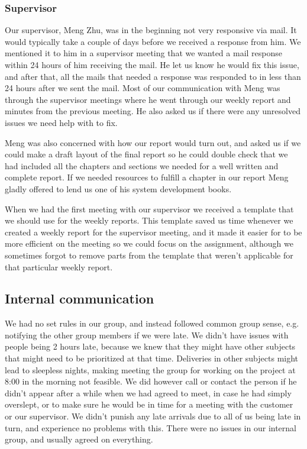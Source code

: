 \subsubsection{Supervisor}
Our supervisor, Meng Zhu, was in the beginning not very responsive via mail. It would typically take a couple of days before we received a response from him. We mentioned it to him in a supervisor meeting that we wanted a mail response within 24 hours of him receiving the mail. He let us know he would fix this issue, and after that, all the mails that needed a response was responded to in less than 24 hours after we sent the mail. Most of our communication with Meng was through the supervisor meetings where he went through our weekly report and minutes from the previous meeting. He also asked us if there were any unresolved issues we need help with to fix. 

Meng was also concerned with how our report would turn out, and asked us if we could make a draft layout of the final report so he could double check that we had included all the chapters and sections we needed for a well written and complete report. If we needed resources to fulfill a chapter in our report Meng gladly offered to lend us one of his system development books. 

When we had the first meeting with our supervisor we received a template that we should use for the weekly reports. This template saved us time whenever we created a weekly report for the supervisor meeting, and it made it easier for to be more efficient on the meeting so we could focus on the assignment, although we sometimes forgot to remove parts from the template that weren't applicable for that particular weekly report.

\subsection{Internal communication}
We had no set rules in our group, and instead followed common group sense, e.g. notifying the other group members if we were late. We didn't have issues with people being 2 hours late, because we knew that they might have other subjects that might need to be prioritized at that time. Deliveries in other subjects might lead to sleepless nights, making meeting the group for working on the project at 8:00 in the morning not feasible. We did however call or contact the person if he didn't appear after a while when we had agreed to meet, in case he had simply overslept, or to make sure he would be in time for a meeting with the customer or our supervisor. We didn't punish any late arrivals due to all of us being late in turn, and experience no problems with this.
There were no issues in our internal group, and usually agreed on everything.


